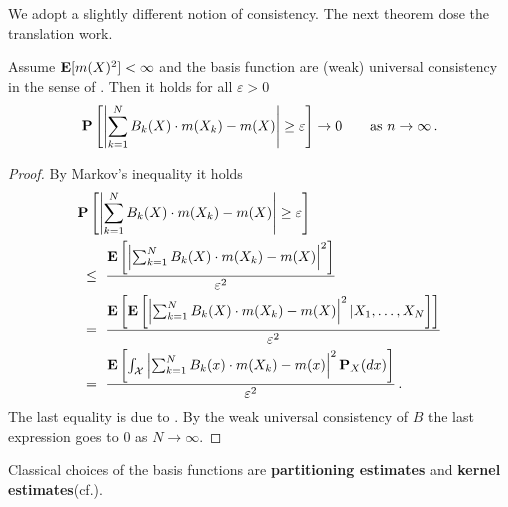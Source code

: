 We adopt a slightly different notion of consistency. The next theorem dose the translation work. 
\begin{theorem}
  Assume
  $\mathbf{E}[m(X)^2]<\infty$
  and the basis function are 
(weak) universal consistency in the sense of 
\cite[Definitien~1.3]{Gyorfi2002}.
Then it holds for all $\varepsilon>0$
\begin{gather}
  \P
  \left[ 
    \left| 
    \sum_{k=1}^{N} 
    B_k(X)
    \cdot
    m(X_k)
    -
    m(X)
    \right|
    \ge
    \varepsilon
  \right]
  \to
  0
  \qquad
  \text{as}
  \ 
  n\to \infty
  \,.
\end{gather}
\end{theorem}
\begin{proof}
  By Markov's inequality it holds
  \begin{align*}
    &
  \P
  \left[ 
    \left| 
    \sum_{k=1}^{N} 
    B_k(X)
    \cdot
    m(X_k)
    -
    m(X)
    \right|
    \ge
    \varepsilon
  \right]
  \\
  &
  \ 
  \le
  \ 
  \frac
  {
  \E
  \left[ 
    \left| 
    \sum_{k=1}^{N} 
    B_k(X)
    \cdot
    m(X_k)
    -
    m(X)
    \right|
    ^2
  \right]
  }
  {\varepsilon^2}
  \\
  &
  \ 
  =
  \ 
  \frac
  {
  \E
  \left[ 
    \E
    \left[ 
    \left| 
    \sum_{k=1}^{N} 
    B_k(X)
    \cdot
    m(X_k)
    -
    m(X)
    \right|
    ^2
    |
    X_1,
    \ldots,
    X_N
    \right]
  \right]
  }
  {\varepsilon^2}
  \\
  &
  \ 
  =
  \ 
  \frac
  {
  \E
  \left[ 
    \int_\mathcal{X}
    \left| 
    \sum_{k=1}^{N} 
    B_k(x)
    \cdot
    m(X_k)
    -
    m(x)
    \right|
    ^2
    \P_X(dx)
  \right]
  }
  {\varepsilon^2}
  \,.
  \end{align*}
  The last equality is due to \cite[(1.2)]{Gyorfi2002}.
  By the weak universal consistency of $B$
  the last expression goes to $0$ as $N\to \infty$.
\end{proof}

Classical choices of the basis functions are \textbf{partitioning estimates} and 
\textbf{kernel estimates}(cf.\cite[§4,§5]{Gyorfi2002}).

